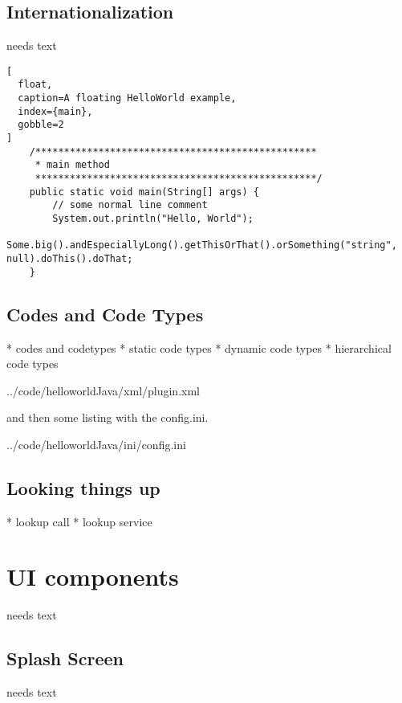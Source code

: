 \documentclass[a4paper,10pt,twoside]{book}
\begin{document}
\section{Internationalization}
needs text

\begin{lstlisting}[
  float,
  caption=A floating HelloWorld example,
  index={main},
  gobble=2
]
    /*************************************************
     * main method
     *************************************************/
    public static void main(String[] args) {
        // some normal line comment
        System.out.println("Hello, World");
        Some.big().andEspeciallyLong().getThisOrThat().orSomething("string", null).doThis().doThat;
    }
\end{lstlisting}

\section{Codes and Code Types}
  * codes and codetypes
  * static code types
  * dynamic code types
  * hierarchical code types


{../code/helloworldJava/xml/plugin.xml}

and then some listing with the config.ini.


{../code/helloworldJava/ini/config.ini}

\section{Looking things up}
  * lookup call
  * lookup service

\chapter{UI components}
needs text

\section{Splash Screen}
needs text
\end{document}
